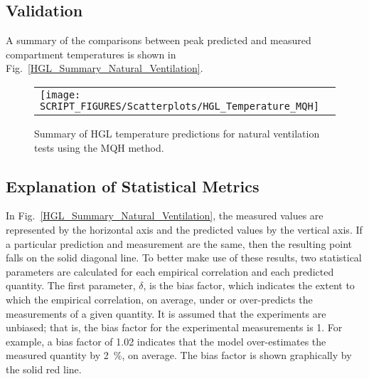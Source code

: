 \clearpage


\subsection*{Validation}

A summary of the comparisons between peak predicted and measured compartment temperatures is shown in Fig.~\ref{HGL_Summary_Natural_Ventilation}.

\begin{figure}[!ht]
\begin{center}
\begin{tabular}{l}
\texttt{[image: SCRIPT\_FIGURES/Scatterplots/HGL\_Temperature\_MQH]}
\end{tabular}
\end{center}
\caption[Summary of HGL temperature predictions for natural ventilation tests (MQH)]
{Summary of HGL temperature predictions for natural ventilation tests using the MQH method.}
\label{HGL Temperature, Natural Ventilation (MQH)}
\end{figure}


\clearpage


\subsection*{Explanation of Statistical Metrics}

In Fig.~\ref{HGL_Summary_Natural_Ventilation}, the measured values are represented by the horizontal axis and the predicted values by the vertical axis. If a particular prediction and measurement are the same, then the resulting point falls on the solid diagonal line. To better make use of these results, two statistical parameters are calculated for each empirical correlation and each predicted quantity. The first parameter, $\delta$, is the bias factor, which indicates the extent to which the empirical correlation, on average, under or over-predicts the measurements of a given quantity. It is assumed that the experiments are unbiased; that is, the bias factor for the experimental measurements is 1. For example, a bias factor of 1.02 indicates that the model over-estimates the measured quantity by \SI{2}{\percent}, on average. The bias factor is shown graphically by the solid red line.

